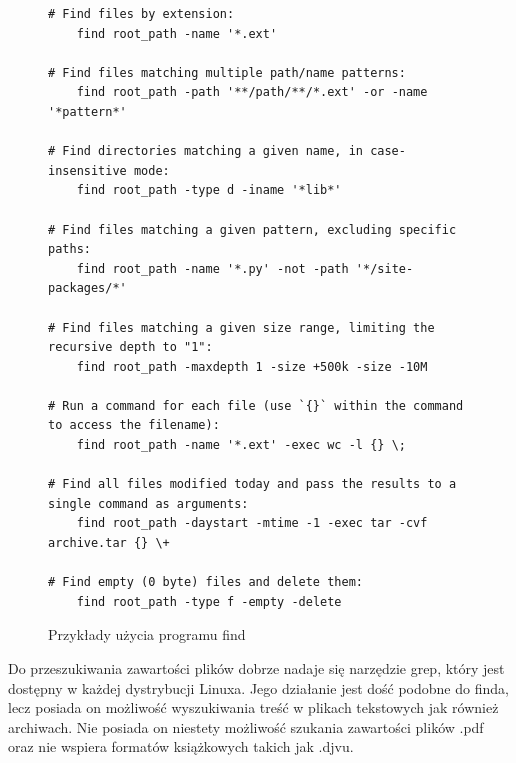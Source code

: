 \begin{figure}[h]
  \centering
  \begin{lstlisting}
# Find files by extension:
    find root_path -name '*.ext'

# Find files matching multiple path/name patterns:
    find root_path -path '**/path/**/*.ext' -or -name '*pattern*'

# Find directories matching a given name, in case-insensitive mode:
    find root_path -type d -iname '*lib*'

# Find files matching a given pattern, excluding specific paths:
    find root_path -name '*.py' -not -path '*/site-packages/*'

# Find files matching a given size range, limiting the recursive depth to "1":
    find root_path -maxdepth 1 -size +500k -size -10M

# Run a command for each file (use `{}` within the command to access the filename):
    find root_path -name '*.ext' -exec wc -l {} \;

# Find all files modified today and pass the results to a single command as arguments:
    find root_path -daystart -mtime -1 -exec tar -cvf archive.tar {} \+

# Find empty (0 byte) files and delete them:
    find root_path -type f -empty -delete
  \end{lstlisting}
  \caption{Przykłady użycia programu find}
  \label{fig:code:bashFindExamples}
\end{figure}

Do przeszukiwania zawartości plików dobrze nadaje się narzędzie grep, który jest
dostępny w każdej dystrybucji Linuxa. Jego działanie jest dość podobne do finda,
lecz posiada on możliwość wyszukiwania treść w plikach tekstowych jak również
archiwach. Nie posiada on niestety możliwość szukania zawartości plików .pdf oraz
nie wspiera formatów książkowych takich jak .djvu.

